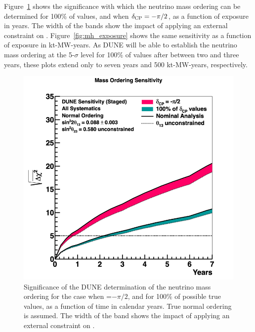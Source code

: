 Figure~\ref{fig:mh_staging} shows the significance
with which the neutrino mass ordering can be determined for 100\% of \deltacp values, and when $\delta_{\rm CP}=-\pi/2$, as a function of exposure in years. The width of the bands show the impact of applying an external constraint on . Figure~\ref{fig:mh_exposure} shows the same sensitivity as a function of exposure in kt-MW-years. As DUNE will be able to establish the neutrino mass ordering at the 5-$\sigma$ level for 100\% of \deltacp values after between two and three years, these plots extend only to seven years and 500 kt-MW-years, respectively.

\begin{figure}[h!]
    \centering
	\includegraphics[width=0.95\linewidth]{graphics/mh_exp_staging_varyconstr_nh_2019_v4.png}	
	\caption[Significance of the DUNE neutrino mass ordering determination, as a function of time]{Significance of the DUNE determination of the neutrino mass ordering for the case when \deltacp=$-\pi/2$, and for 100\% of possible true \deltacp values, as a function of time in calendar years. True normal ordering is assumed. The width of the band shows the impact of applying an external constraint on .}
    \label{fig:mh_staging}
\end{figure}

